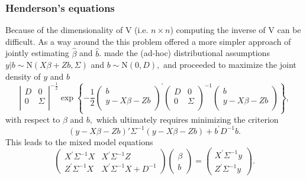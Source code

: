 \documentclass[12pt, a4paper]{report}
\theoremstyle{plain}
\theoremstyle{definition}
\theoremstyle{remark}
\begin{document}
			\subsubsection{Henderson's equations}
			
			Because of the dimensionality of V (i.e. $n \times n$) computing the inverse of V can be difficult. As a way around the this problem \citet{Henderson53, Henderson59,Henderson63,Henderson73,Henderson84a} offered a more simpler approach of jointly estimating $\hat{\beta}$ and $\hat{b}$.
			\cite{Henderson:1950} made the (ad-hoc) distributional assumptions $y|b \sim \mathrm{N} (X \beta + Zb, \Sigma)$ and $b \sim \mathrm{N}(0,D),$ and proceeded to maximize the joint density of $y$ and $b$
			\begin{equation}
			\left|
			\begin{array}{cc}
			D & 0 \\
			0 & \Sigma \\
			\end{array}
			\right|^{-\frac{1}{2}}
			\exp
			\left\{ -\frac{1}{2}
			\left(
			\begin{array}{c}
			b \\
			y - X \beta -Zb \\
			\end{array}
			\right)^\prime
			\left( \begin{array}{cc}
			D & 0 \\
			0 & \Sigma \\
			\end{array}\right)^{-1}
			\left(
			\begin{array}{c}
			b \\
			y - X \beta -Zb \\
			\end{array}
			\right)
			\right\},
			\label{u&beta:JointDensity}
			\end{equation}
			with respect to $\beta$ and $b,$ which ultimately requires minimizing the criterion
			\begin{equation}
			(y - X \beta -Zb)'\Sigma^{-1}(y - X \beta -Zb) + b^\prime D^{-1}b.
			\label{Henderson:Criterion}
			\end{equation}
			This leads to the mixed model equations
			\begin{equation}
			\left(\begin{array}{cc}
			X^\prime\Sigma^{-1}X & X^\prime\Sigma^{-1}Z
			\\
			Z^\prime\Sigma^{-1}X & X^\prime\Sigma^{-1}X + D^{-1}
			\end{array}\right)
			\left(\begin{array}{c}
			\beta \\
			b
			\end{array}\right)
			=
			\left(\begin{array}{c}
			X^\prime\Sigma^{-1}y \\
			Z^\prime\Sigma^{-1}y
			\end{array}\right).
			\label{Henderson:Equations}
			\end{equation}
\end{document}
